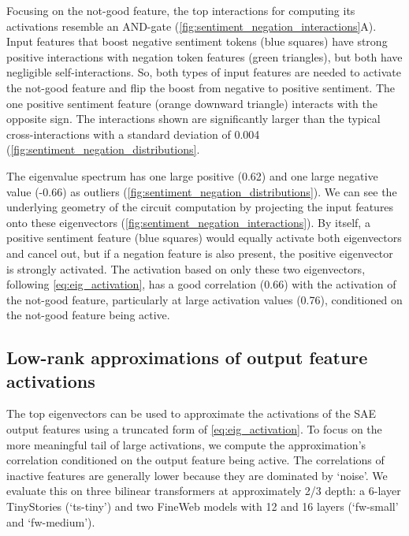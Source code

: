 \documentclass{article} %
\begin{document}
Focusing on the not-good feature, the top interactions for computing its activations resemble an AND-gate (\autoref{fig:sentiment_negation_interactions}A). Input features that boost negative sentiment tokens (blue squares) have strong positive interactions with negation token features (green triangles), but both have negligible self-interactions. So, both types of input features are needed to activate the not-good feature and flip the boost from negative to positive sentiment. The one positive sentiment feature (orange downward triangle) interacts with the opposite sign. The interactions shown are significantly larger than the typical cross-interactions with a standard deviation of 0.004 (\autoref{fig:sentiment_negation_distributions}. 

The eigenvalue spectrum has one large positive (0.62) and one large negative value (-0.66) as outliers (\autoref{fig:sentiment_negation_distributions}). We can see the underlying geometry of the circuit computation by projecting the input features onto these eigenvectors (\autoref{fig:sentiment_negation_interactions}). By itself, a positive sentiment feature (blue squares) would equally activate both eigenvectors and cancel out, but if a negation feature is also present, the positive eigenvector is strongly activated.  The activation based on only these two eigenvectors, following \autoref{eq:eig_activation}, has a good correlation (0.66) with the activation of the not-good feature, particularly at large activation values (0.76), conditioned on the not-good feature being active.


\subsection{Low-rank approximations of output feature activations}
The top eigenvectors can be used to approximate the activations of the SAE output features using a truncated form of \autoref{eq:eig_activation}. To focus on the more meaningful tail of large activations, we compute the approximation's correlation conditioned on the output feature being active. The correlations of inactive features are generally lower because they are dominated by `noise'. We evaluate this on three bilinear transformers at approximately 2/3 depth: a 6-layer TinyStories (`ts-tiny') and two FineWeb models with 12 and 16 layers (`fw-small' and `fw-medium').
\end{document}

